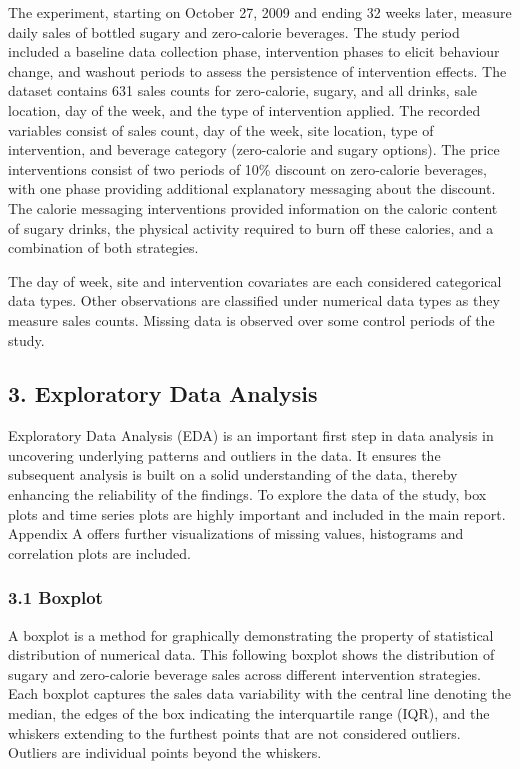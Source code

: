 \documentclass[
]{article}
\begin{document}
The experiment, starting on October 27, 2009 and ending 32 weeks later,
measure daily sales of bottled sugary and zero-calorie beverages. The
study period included a baseline data collection phase, intervention
phases to elicit behaviour change, and washout periods to assess the
persistence of intervention effects. The dataset contains 631 sales
counts for zero-calorie, sugary, and all drinks, sale location, day of
the week, and the type of intervention applied. The recorded variables
consist of sales count, day of the week, site location, type of
intervention, and beverage category (zero-calorie and sugary options).
The price interventions consist of two periods of 10\% discount on
zero-calorie beverages, with one phase providing additional explanatory
messaging about the discount. The calorie messaging interventions
provided information on the caloric content of sugary drinks, the
physical activity required to burn off these calories, and a combination
of both strategies.

The day of week, site and intervention covariates are each considered
categorical data types. Other observations are classified under
numerical data types as they measure sales counts. Missing data is
observed over some control periods of the study.

\hypertarget{exploratory-data-analysis}{%
\subsection{3. Exploratory Data
Analysis}\label{exploratory-data-analysis}}

Exploratory Data Analysis (EDA) is an important first step in data
analysis in uncovering underlying patterns and outliers in the data. It
ensures the subsequent analysis is built on a solid understanding of the
data, thereby enhancing the reliability of the findings. To explore the
data of the study, box plots and time series plots are highly important
and included in the main report. Appendix A offers further
visualizations of missing values, histograms and correlation plots are
included.

\hypertarget{boxplot}{%
\subsubsection{3.1 Boxplot}\label{boxplot}}

A boxplot is a method for graphically demonstrating the property of
statistical distribution of numerical data. This following boxplot shows
the distribution of sugary and zero-calorie beverage sales across
different intervention strategies. Each boxplot captures the sales data
variability with the central line denoting the median, the edges of the
box indicating the interquartile range (IQR), and the whiskers extending
to the furthest points that are not considered outliers. Outliers are
individual points beyond the whiskers.
\end{document}
